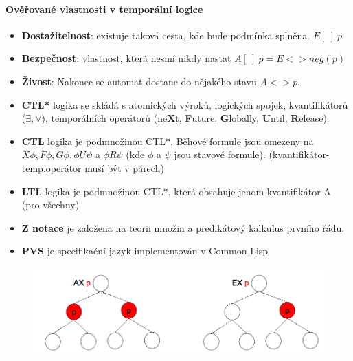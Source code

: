 \paragraph{Ověřované vlastnosti v temporální logice}
\begin{itemize}[itemsep=0px]
\item \textbf{Dostažitelnost}: existuje taková cesta, kde bude podmínka splněna. $E[~]~p$
\item \textbf{Bezpečnost}: vlastnost, která nesmí nikdy nastat $A[~]~p = E<>neg(p)$
\item \textbf{Živost}: Nakonec se automat dostane do nějakého stavu $A<>p$.
\end{itemize}

\begin{itemize}[itemsep=0px]
\item \textbf{CTL*} logika se skládá s atomických výroků, logických spojek, kvantifikátorů ($\exists, \forall$), temporálních operátorů (ne\textbf{X}t, \textbf{F}uture, \textbf{G}lobally, \textbf{U}ntil, \textbf{R}elease).
\item \textbf{CTL} logika je podmnožinou CTL*. Běhové formule jsou omezeny na $X\phi, F\phi, G\phi, \phi U\psi$ a $\phi R\psi$ (kde $\phi$ a $\psi$ jsou stavové formule). (kvantifikátor-temp.operátor musí být v párech)
\item \textbf{LTL} logika je podmnožinou CTL*, která obsahuje jenom kvantifikátor A (pro všechny)
\item \textbf{Z notace} je založena na teorii množin a predikátový kalkulus prvního řádu.
\item \textbf{PVS} je specifikační jazyk implementován v Common Lisp
\end{itemize}

\begin{figure}[h!]
\centering
\includegraphics[width=130mm]{15/images/temporal}
\end{figure}
